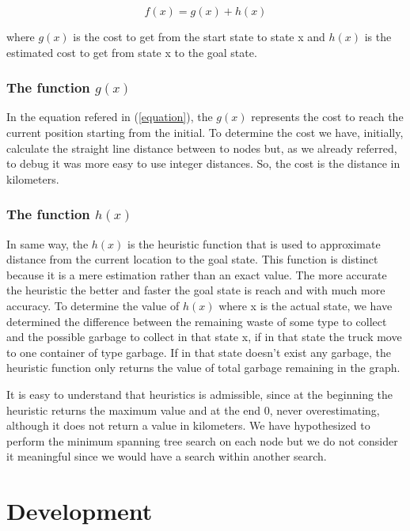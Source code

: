 \documentclass[a4paper]{article}
\begin{document}
\begin{equation}\label{equation}
f(x) = g(x) + h(x)
\end{equation}

where $g(x)$ is the cost to get from the start state to state x and $h(x)$ is the estimated cost to get from state x to the goal state.

\subsubsection{The function $g(x)$}\label{cost_function}

In the equation refered in (\ref{equation}), the $g(x)$ represents the cost to reach the current position starting from the initial. 
To determine the cost we have, initially, calculate the straight line distance between to nodes but, as we already referred, to debug it was more easy to use integer distances. So, the cost is the distance in kilometers.

\subsubsection{The function $h(x)$}\label{heuristic_function}

In same way, the $h(x)$ is the heuristic function that is used to approximate distance from the current location to the goal state. This function is distinct because it is a mere estimation rather than an exact value. The more accurate the heuristic the better and faster the goal state is reach and with much more accuracy.
To determine the value of $h(x)$ where x is the actual state, we have determined the difference between the remaining waste of some type to collect and the possible garbage to collect in that state x, if in that state the truck move to one container of type garbage. If in that state doesn't exist any garbage, the heuristic function only returns the value of total garbage remaining in the graph.


It is easy to understand that heuristics is admissible, since at the beginning the heuristic returns the maximum value and at the end 0, never overestimating, although it does not return a value in kilometers. We have hypothesized to perform the minimum spanning tree search on each node but we do not consider it meaningful since we would have a search within another search.

\section{Development}
\end{document}
